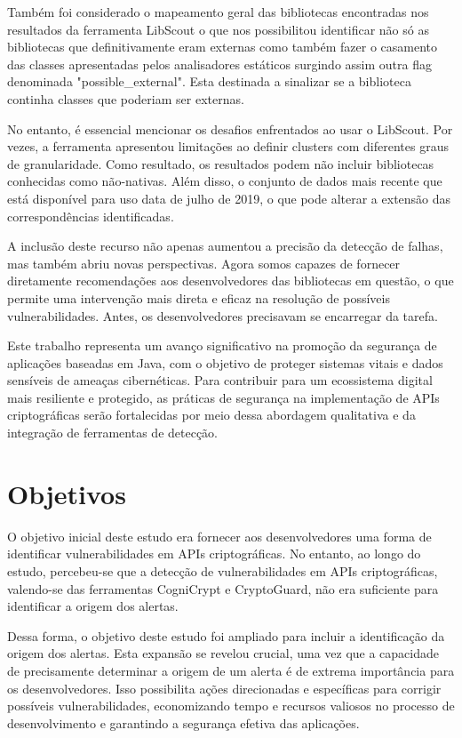 Também foi considerado o mapeamento geral das bibliotecas encontradas nos resultados da ferramenta LibScout \cite{LibScout} o que nos possibilitou identificar não só as bibliotecas que definitivamente eram externas como também fazer o casamento das classes apresentadas pelos analisadores estáticos surgindo assim outra flag denominada "possible\_external". Esta destinada a sinalizar se a biblioteca continha classes que poderiam ser externas. 

No entanto, é essencial mencionar os desafios enfrentados ao usar o LibScout. Por vezes, a ferramenta apresentou limitações ao definir clusters com diferentes graus de granularidade. Como resultado, os resultados podem não incluir bibliotecas conhecidas como não-nativas. Além disso, o conjunto de dados mais recente que está disponível para uso data de julho de 2019, o que pode alterar a extensão das correspondências identificadas.

A inclusão deste recurso não apenas aumentou a precisão da detecção de falhas, mas também abriu novas perspectivas. Agora somos capazes de fornecer diretamente recomendações aos desenvolvedores das bibliotecas em questão, o que permite uma intervenção mais direta e eficaz na resolução de possíveis vulnerabilidades. Antes, os desenvolvedores precisavam se encarregar da tarefa.

Este trabalho representa um avanço significativo na promoção da segurança de aplicações baseadas em Java, com o objetivo de proteger sistemas vitais e dados sensíveis de ameaças cibernéticas. Para contribuir para um ecossistema digital mais resiliente e protegido, as práticas de segurança na implementação de APIs criptográficas serão fortalecidas por meio dessa abordagem qualitativa e da integração de ferramentas de detecção.

\section{Objetivos}

O objetivo inicial deste estudo era fornecer aos desenvolvedores uma forma de identificar vulnerabilidades em APIs criptográficas. No entanto, ao longo do estudo, percebeu-se que a detecção de vulnerabilidades em APIs criptográficas, valendo-se das ferramentas CogniCrypt e CryptoGuard, não era suficiente para identificar a origem dos alertas.

Dessa forma, o objetivo deste estudo foi ampliado para incluir a identificação da origem dos alertas. Esta expansão se revelou crucial, uma vez que a capacidade de precisamente determinar a origem de um alerta é de extrema importância para os desenvolvedores. Isso possibilita ações direcionadas e específicas para corrigir possíveis vulnerabilidades, economizando tempo e recursos valiosos no processo de desenvolvimento e garantindo a segurança efetiva das aplicações.

